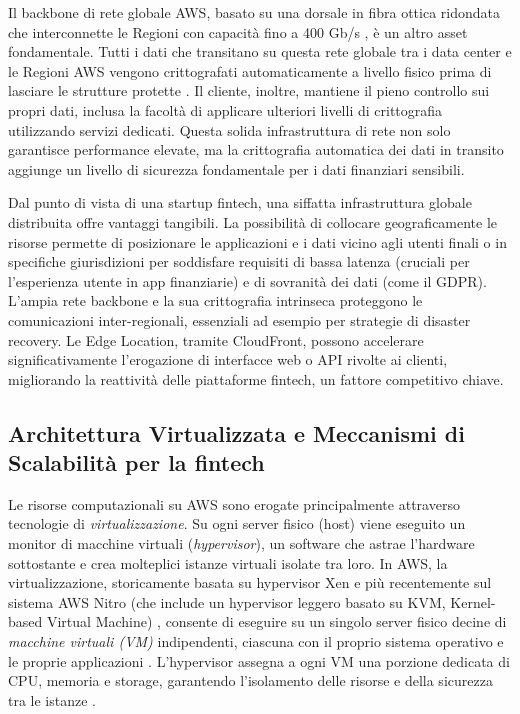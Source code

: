 Il backbone di rete globale AWS, basato su una dorsale in fibra ottica ridondata che interconnette le Regioni con capacità fino a 400 Gb/s \cite{aws-network}, è un altro asset fondamentale. Tutti i dati che transitano su questa rete globale tra i data center e le Regioni AWS vengono crittografati automaticamente a livello fisico prima di lasciare le strutture protette \cite{aws-network}. Il cliente, inoltre, mantiene il pieno controllo sui propri dati, inclusa la facoltà di applicare ulteriori livelli di crittografia utilizzando servizi dedicati. Questa solida infrastruttura di rete non solo garantisce performance elevate, ma la crittografia automatica dei dati in transito aggiunge un livello di sicurezza fondamentale per i dati finanziari sensibili.

Dal punto di vista di una startup fintech, una siffatta infrastruttura globale distribuita offre vantaggi tangibili. La possibilità di collocare geograficamente le risorse permette di posizionare le applicazioni e i dati vicino agli utenti finali o in specifiche giurisdizioni per soddisfare requisiti di bassa latenza (cruciali per l'esperienza utente in app finanziarie) e di sovranità dei dati (come il GDPR). L'ampia rete backbone e la sua crittografia intrinseca proteggono le comunicazioni inter-regionali, essenziali ad esempio per strategie di disaster recovery. Le Edge Location, tramite CloudFront, possono accelerare significativamente l'erogazione di interfacce web o API rivolte ai clienti, migliorando la reattività delle piattaforme fintech, un fattore competitivo chiave.

\subsection{Architettura Virtualizzata e Meccanismi di Scalabilità per la fintech}
\label{sec:virtualization-scalability-fintech}

Le risorse computazionali su AWS sono erogate principalmente attraverso tecnologie di \textit{virtualizzazione}. Su ogni server fisico (host) viene eseguito un monitor di macchine virtuali (\textit{hypervisor}), un software che astrae l'hardware sottostante e crea molteplici istanze virtuali isolate tra loro. In AWS, la virtualizzazione, storicamente basata su hypervisor Xen e più recentemente sul sistema AWS Nitro (che include un hypervisor leggero basato su KVM, Kernel-based Virtual Machine) \cite{aws-nitro-hypervisor}, consente di eseguire su un singolo server fisico decine di \textit{macchine virtuali (VM)} indipendenti, ciascuna con il proprio sistema operativo e le proprie applicazioni \cite{ibm_iaas}. L'hypervisor assegna a ogni VM una porzione dedicata di CPU, memoria e storage, garantendo l'isolamento delle risorse e della sicurezza tra le istanze \cite{ibm_iaas}.

